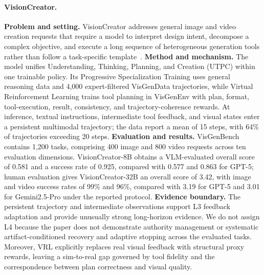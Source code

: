 \paragraph{VisionCreator.}
\textbf{Problem and setting.} VisionCreator addresses general image and video creation requests that require a model to interpret design intent, decompose a complex objective, and execute a long sequence of heterogeneous generation tools rather than follow a task-specific template~\cite{avg260302681}. \textbf{Method and mechanism.} The model unifies Understanding, Thinking, Planning, and Creation (UTPC) within one trainable policy. Its Progressive Specialization Training uses general reasoning data and 4,000 expert-filtered VisGenData trajectories, while Virtual Reinforcement Learning trains tool planning in VisGenEnv with plan, format, tool-execution, result, consistency, and trajectory-coherence rewards. At inference, textual instructions, intermediate tool feedback, and visual states enter a persistent multimodal trajectory; the data report a mean of 15 steps, with 64\% of trajectories exceeding 20 steps. \textbf{Evaluation and results.} VisGenBench contains 1,200 tasks, comprising 400 image and 800 video requests across ten evaluation dimensions. VisionCreator-8B obtains a VLM-evaluated overall score of 0.581 and a success rate of 0.925, compared with 0.577 and 0.863 for GPT-5; human evaluation gives VisionCreator-32B an overall score of 3.42, with image and video success rates of 99\% and 96\%, compared with 3.19 for GPT-5 and 3.01 for Gemini2.5-Pro under the reported protocol. \textbf{Evidence boundary.} The persistent trajectory and intermediate observations support L3 feedback adaptation and provide unusually strong long-horizon evidence. We do not assign L4 because the paper does not demonstrate authority management or systematic artifact-conditioned recovery and adaptive stopping across the evaluated tasks. Moreover, VRL explicitly replaces real visual feedback with structural proxy rewards, leaving a sim-to-real gap governed by tool fidelity and the correspondence between plan correctness and visual quality.



